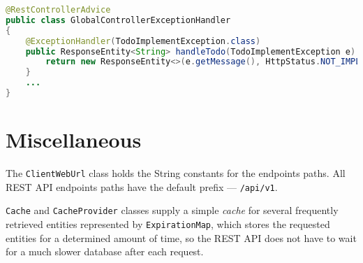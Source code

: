 \begin{lstlisting}[language=java, caption=GlobalControllerExceptionHandler.java, label=lst:err]
@RestControllerAdvice
public class GlobalControllerExceptionHandler
{
    @ExceptionHandler(TodoImplementException.class)
    public ResponseEntity<String> handleTodo(TodoImplementException e) {
        return new ResponseEntity<>(e.getMessage(), HttpStatus.NOT_IMPLEMENTED);
    }
    ...
}
\end{lstlisting}

\section{Miscellaneous}
The \texttt{ClientWebUrl} class holds the String constants for the endpoints paths. All REST API endpoints paths have the default prefix --- \texttt{/api/v1}.

\texttt{Cache} and \texttt{CacheProvider} classes supply a simple \emph{cache} for several frequently retrieved entities represented by \texttt{ExpirationMap}, which stores the requested entities for a determined amount of time, so the REST API does not have to wait for a much slower database after each request.
